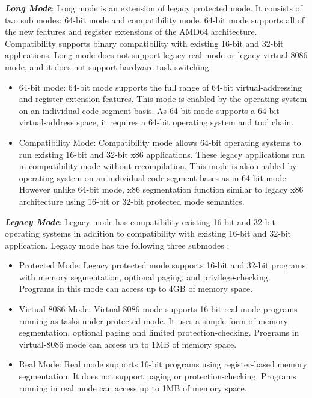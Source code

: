 \documentclass[a4paper,12pt]{report}
\begin{document}



\emph {\bf Long Mode}: Long mode is an extension of legacy protected mode. It consists of two sub modes: 64-bit mode and compatibility mode. 64-bit mode supports all of the new features and register extensions of the AMD64 architecture. Compatibility supports binary compatibility with existing 16-bit and 32-bit applications. Long mode does not support legacy real mode or legacy virtual-8086 mode, and it does not support hardware task switching.
\begin{itemize}

\item 64-bit mode: 64-bit mode supports the full range of 64-bit virtual-addressing and register-extension features. This mode is enabled by the operating system on an individual code segment basis. As 64-bit mode supports a 64-bit virtual-address space, it requires a 64-bit operating system and tool chain.


\item Compatibility Mode: Compatibility mode allows 64-bit operating systems to run existing 16-bit and 32-bit x86 applications. These legacy applications run in compatibility mode without recompilation. This mode is also enabled by operating system on an individual code segment bases as in 64 bit mode. However unlike 64-bit mode, x86 segmentation function similar to legacy x86 architecture using 16-bit or 32-bit protected mode semantics.

\end{itemize}



\emph {\bf Legacy Mode}: Legacy mode has compatibility existing 16-bit and 32-bit operating systems in addition to compatibility with existing 16-bit and 32-bit application. Legacy mode has the following three submodes : 

\begin{itemize}

\item Protected Mode: Legacy protected mode supports 16-bit and 32-bit programs with memory segmentation, optional paging, and privilege-checking. Programs in this mode can access up to 4GB of memory space.


\item Virtual-8086 Mode: Virtual-8086 mode supports 16-bit real-mode programs running as tasks under protected mode. It uses a simple form of memory segmentation, optional paging and limited protection-checking. Programs in virtual-8086 mode can access up to 1MB of memory space.


\item Real Mode: Real mode supports 16-bit programs using register-based memory segmentation. It does not support paging or protection-checking. Programs running in real mode can access up to 1MB of memory space.
\end{itemize}
\end{document}
